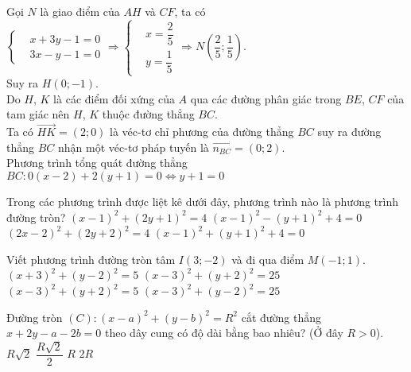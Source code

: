 \begin{ex}
{	Gọi $N$ là giao điểm của $AH$ và $CF$, ta có $\left\{\begin{aligned}&x+3y-1=0\\&3x-y-1=0\end{aligned}\right.\Rightarrow \left\{\begin{aligned}&x=\dfrac{2}{5}\\&y=\dfrac{1}{5}\end{aligned}\right.\Rightarrow N\left(\dfrac{2}{5};\dfrac{1}{5}\right)$.\\
	Suy ra $H(0;-1)$.\\	
	Do $H$, $K$ là các điểm đối xứng của $A$ qua các đường phân giác trong $BE$, $CF$ của tam giác nên $H$, $K$ thuộc đường thẳng $BC$. \\
	Ta có $\vec{HK}=(2;0)$ là véc-tơ chỉ phương của đường thẳng $BC$ suy ra đường thẳng $BC$ nhận một véc-tơ pháp tuyến là $\vec{n_{BC}}=(0;2)$.\\
	Phương trình tổng quát đường thẳng $BC:0(x-2)+2(y+1)=0\Leftrightarrow y+1=0$
}
\end{ex}
\begin{ex}%
	Trong các phương trình được liệt kê dưới đây, phương trình nào là phương trình đường tròn?
	\choice
	{$(x-1)^2+(2y+1)^2=4$}
	{$(x-1)^2-(y+1)^2+4=0$}
	{\True $(2x-2)^2+(2y+2)^2=4$}
	{$(x-1)^2+(y+1)^2+4=0$}
\end{ex}
\begin{ex}%
	Viết phương trình đường tròn tâm $I(3;-2)$ và đi qua điểm $M(-1;1)$.
	\choice
	{$(x+3)^2+(y-2)^2=5$}
	{\True $(x-3)^2+(y+2)^2=25$}
	{$(x-3)^2+(y+2)^2=5$}
	{$(x-3)^2+(y-2)^2=25$}
\end{ex}
\begin{ex}%
	Đường tròn $(C):(x-a)^2+(y-b)^2=R^2$ cắt đường thẳng $x+2y-a-2b=0$ theo dây cung có độ dài bằng bao nhiêu? (Ở đây $R>0$).
	\choice
	{$R\sqrt{2}$}
	{$\dfrac{R\sqrt{2}}{2}$}
	{$R$}
	{\True $2R$}
\end{ex}
